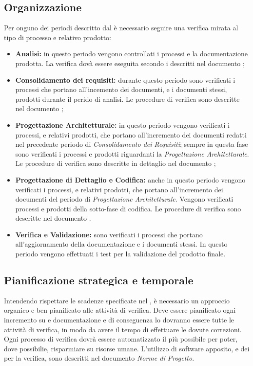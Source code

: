   \subsection{Organizzazione}
    Per onguno dei periodi descritto dal  è necessario seguire una verifica mirata al tipo di processo e relativo prodotto:
    \begin{itemize}
      \item \textbf{Analisi:} in questo periodo vengono controllati i processi e la documentazione prodotta.
      La verifica dovà essere eseguita secondo i  descritti nel documento ;
      \item \textbf{Consolidamento dei requisiti:} durante questo periodo sono verificati i processi che portano all'incemento dei documenti, e i documenti stessi, prodotti durante il perido di analisi.
      Le procedure di verifica sono descritte nel documento ;
      \item \textbf{Progettazione Architetturale:} in questo periodo vengono verificati i processi, e relativi prodotti, che portano all'incremento dei documenti redatti nel precedente periodo di \emph{Consolidamento dei Requisiti};
      sempre in questa fase sono verificati i processi e prodotti riguardanti la \emph{Progettazione Architetturale}.
      Le procedure di verifica sono descritte in dettaglio nel documento ;
      \item \textbf{Progettazione di Dettaglio e Codifica:} anche in questo periodo vengono verificati i processi, e relativi prodotti, che portano all'incremento dei documenti del periodo di \emph{Progettazione Architetturale}.
      Vengono verificati processi e prodotti della sotto-fase di codifica. Le procedure di verifica sono descritte nel documento .
      \item \textbf{Verifica e Validazione:} sono verificati i processi che portano all'aggiornamento della documentazione e i documenti stessi.
      In questo periodo vengono effettuati i test per la validazione del prodotto finale.
    \end{itemize}

  \subsection{Pianificazione strategica e temporale}
    Intendendo rispettare le scadenze specificate nel , è necessario un approccio organico e ben pianificato alle attività di verifica.
    Deve essere pianificato ogni incremento su  e documentazione e di conseguenza lo dovranno essere tutte le attività di verifica,
    in modo da avere il tempo di effettuare le dovute correzioni. Ogni processo di verifica dovrà essere automatizzato il più possibile per poter, dove possibilie,
    risparmiare su risorse umane. L'utilizzo di software apposito, e dei  per la verifica, sono descritti nel documento \emph{Norme di Progetto}.

